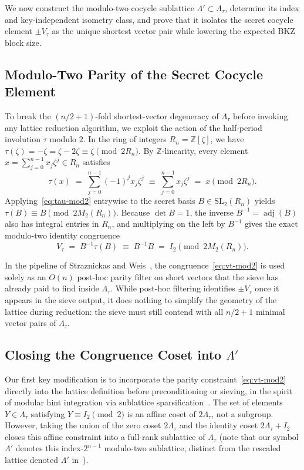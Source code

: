 \documentclass[11pt,a4paper]{article}
\theoremstyle{definition}
\newcommand{\Z}{\mathbb{Z}}
\newcommand{\Lt}{\Lambda_\tau}
\newcommand{\Lp}{\Lambda'}
\newcommand{\Vt}{V_\tau}
\newcommand{\adj}{\operatorname{adj}}
\begin{document}
We now construct the modulo-two cocycle sublattice $\Lp \subset \Lt$, determine its index and key-independent isometry class, and prove that it isolates the secret cocycle element $\pm\Vt$ as the unique shortest vector pair while lowering the expected BKZ block size.

\subsection{Modulo-Two Parity of the Secret Cocycle Element}
To break the $(n/2+1)$-fold shortest-vector degeneracy of $\Lt$ before invoking any lattice reduction algorithm, we exploit the action of the half-period involution $\tau$ modulo $2$. In the ring of integers $R_n = \Z[\zeta]$, we have $\tau(\zeta) = -\zeta = \zeta - 2\zeta \equiv \zeta \pmod{2R_n}$. By $\Z$-linearity, every element $x = \sum_{j=0}^{n-1} x_j \zeta^j \in R_n$ satisfies
\begin{equation}\label{eq:tau-mod2}
  \tau(x) \;=\; \sum_{j=0}^{n-1} (-1)^j x_j \zeta^j \;\equiv\; \sum_{j=0}^{n-1} x_j \zeta^j \;=\; x \pmod{2R_n}.
\end{equation}
Applying~\eqref{eq:tau-mod2} entrywise to the secret basis $B \in \mathrm{SL}_2(R_n)$ yields $\tau(B) \equiv B \pmod{2M_2(R_n)}$. Because $\det B = 1$, the inverse $B^{-1} = \adj(B)$ also has integral entries in $R_n$, and multiplying on the left by $B^{-1}$ gives the exact modulo-two identity congruence
\begin{equation}\label{eq:vt-mod2}
  \Vt \;=\; B^{-1}\tau(B) \;\equiv\; B^{-1} B \;=\; I_2 \pmod{2M_2(R_n)}.
\end{equation}

In the pipeline of Straznickas and Weis~\cite[Appendix~D]{SW26}, the congruence~\eqref{eq:vt-mod2} is used solely as an $O(n)$ post-hoc parity filter on short vectors that the sieve has already paid to find inside $\Lt$. While post-hoc filtering identifies $\pm\Vt$ once it appears in the sieve output, it does nothing to simplify the geometry of the lattice during reduction: the sieve must still contend with all $n/2+1$ minimal vector pairs of $\Lt$.

\subsection{Closing the Congruence Coset into \texorpdfstring{$\Lp$}{Lambda'}}
Our first key modification is to incorporate the parity constraint~\eqref{eq:vt-mod2} directly into the lattice definition before preconditioning or sieving, in the spirit of modular hint integration via sublattice sparsification~\cite{DDGR20}. The set of elements $Y \in \Lt$ satisfying $Y \equiv I_2 \pmod 2$ is an affine coset of $2\Lt$, not a subgroup. However, taking the union of the zero coset $2\Lt$ and the identity coset $2\Lt + I_2$ closes this affine constraint into a full-rank sublattice of $\Lt$ (note that our symbol $\Lp$ denotes this index-$2^{n-1}$ modulo-two sublattice, distinct from the rescaled lattice denoted $\Lambda'$ in~\cite[Corollary~4.6]{SW26}).
\end{document}
